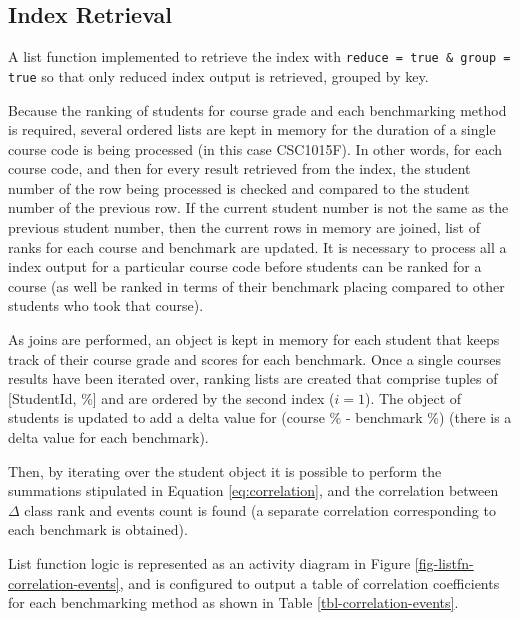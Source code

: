 \subsection{Index Retrieval}
A list function implemented to retrieve the index with \texttt{reduce = true \& group = true} so that only reduced index output is retrieved, grouped by key.

Because the ranking of students for course grade and each benchmarking method is required, several ordered lists are kept in memory for the duration of a single course code is being processed (in this case CSC1015F). In other words, for each course code, and then for every result retrieved from the index, the student number of the row being processed is checked and compared to the student number of the previous row. If the current student number is not the same as the previous student number, then the current rows in memory are joined, list of ranks for each course and benchmark are updated. It is necessary to process all a index output for a particular course code before students can be ranked for a course (as well be ranked in terms of their benchmark placing compared to other students who took that course).

As joins are performed, an object is kept in memory for each student that keeps track of their course grade and scores for each benchmark. Once a single courses results have been iterated over, ranking lists are created that comprise tuples of [StudentId, \%] and are ordered by the second index ($i = 1$). The object of students is updated to add a delta value for (course \% - benchmark \%) (there is a delta value for each benchmark).

Then, by iterating over the student object it is possible to perform the summations stipulated in Equation \ref{eq:correlation}, and the correlation between $\Delta$ class rank and events count is found (a separate correlation corresponding to each benchmark is obtained).

List function logic is represented as an activity diagram in Figure \ref{fig-listfn-correlation-events}, and is configured to output a table of correlation coefficients for each benchmarking method as shown in Table \ref{tbl-correlation-events}.


